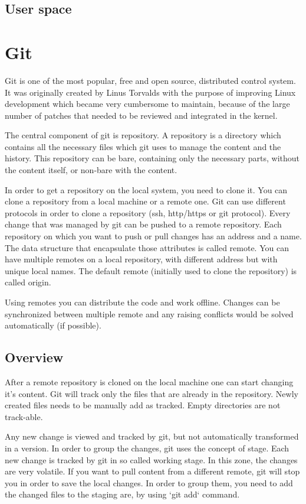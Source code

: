     \subsection{User space}

\section{Git}
    Git is one of the most popular, free and open source, distributed control system. It was originally created by Linus Torvalds with the purpose of improving Linux development which became very cumbersome to maintain, because of the large number of patches that needed to be reviewed and integrated in the kernel.
    
    The central component of git is repository. A repository is a directory which contains all the necessary files which git uses to manage the content and the history. This repository can be bare, containing only the necessary parts, without the content itself, or non-bare with the content.
    
    In order to get a repository on the local system, you need to clone it. You can clone a repository from a local machine or a remote one. Git can use different protocols in order to clone a repository (ssh, http/https or git protocol). Every change that was managed by git can be pushed to a remote repository. Each repository on which you want to push or pull changes has an address and a name. The data structure that encapsulate those attributes is called remote. You can have multiple remotes on a local repository, with different address but with unique local names. The default remote (initially used to clone the repository) is called origin.
    
    Using remotes you can distribute the code and work offline. Changes can be synchronized between multiple remote and any raising conflicts would be solved automatically (if possible).
    
    \subsection{Overview}
        After a remote repository is cloned on the local machine one can start changing it's content. Git will track only the files that are already in the repository. Newly created files needs to be manually add as tracked. Empty directories are not track-able.
        
        Any new change is viewed and tracked by git, but not automatically transformed in a version. In order to group the changes, git uses the concept of stage. Each new change is tracked by git in so called working stage. In this zone, the changes are very volatile. If you want to pull content from a different remote, git will stop you in order to save the local changes. In order to group them, you need to add the changed files to the staging are, by using `git add` command.
        
